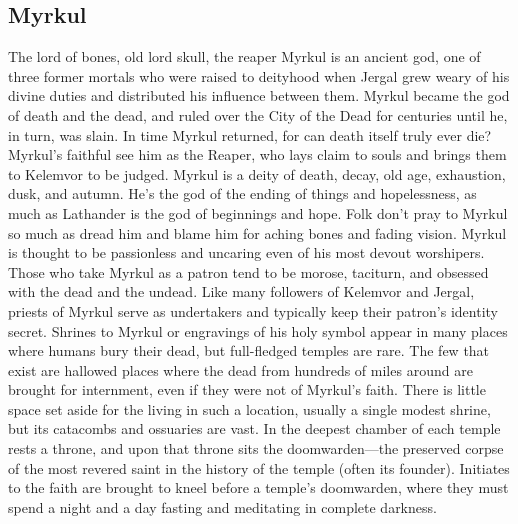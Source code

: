 \documentclass[10pt,a4paper,twoside,twocolumn,openany,bg=print,nodeprecatedcode]{dndbook}
\begin{document}
\subsection{Myrkul}
The lord of bones, old lord skull, the reaper
Myrkul is an ancient god, one of three former mortals who were raised to deityhood when Jergal grew weary of his divine duties and distributed his influence between them. Myrkul became the god of death and the dead, and ruled over the City of the Dead for centuries until he, in turn, was slain. In time Myrkul returned, for can death itself truly ever die? Myrkul's faithful see him as the Reaper, who lays claim to souls and brings them to Kelemvor to be judged.
Myrkul is a deity of death, decay, old age, exhaustion, dusk, and autumn. He's the god of the ending of things and hopelessness, as much as Lathander is the god of beginnings and hope. Folk don't pray to Myrkul so much as dread him and blame him for aching bones and fading vision. Myrkul is thought to be passionless and uncaring even of his most devout worshipers. Those who take Myrkul as a patron tend to be morose, taciturn, and obsessed with the dead and the undead. Like many followers of Kelemvor and Jergal, priests of Myrkul serve as undertakers and typically keep their patron's identity secret.
Shrines to Myrkul or engravings of his holy symbol appear in many places where humans bury their dead, but full-fledged temples are rare. The few that exist are hallowed places where the dead from hundreds of miles around are brought for internment, even if they were not of Myrkul's faith. There is little space set aside for the living in such a location, usually a single modest shrine, but its catacombs and ossuaries are vast. In the deepest chamber of each temple rests a throne, and upon that throne sits the doomwarden—the preserved corpse of the most revered saint in the history of the temple (often its founder). Initiates to the faith are brought to kneel before a temple's doomwarden, where they must spend a night and a day fasting and meditating in complete darkness.
\end{document}
